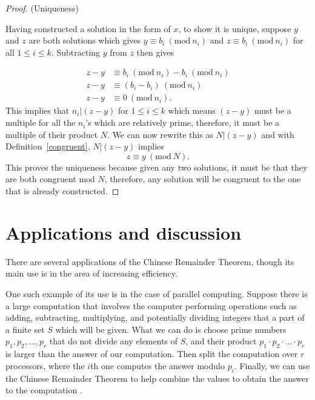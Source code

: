 \documentclass[12pt,a4paper,reqno,parskip=full]{amsart}
\numberwithin{equation}{section}
\theoremstyle{plain}
\theoremstyle{definition}
\newcommand{\Mod}[1]{\ (\mathrm{mod}\ #1)}
\begin{document}
\begin{proof}
	(Uniqueness)

	Having constructed a solution in the form of $x$, to show it is unique, suppose $y$ and $z$ are both solutions which gives $y\equiv b_i \Mod{n_i}$ and $z \equiv b_i \Mod{n_i}$ for all $ 1 \le i \le k$. Subtracting $y$ from $z$ then gives

	\begin{align*}
		z-y &\equiv b_i \Mod{n_i} - b_i \Mod{n_i}\\
		z-y &\equiv (b_i-b_i) \Mod{n_i}\\
		z-y &\equiv 0 \Mod{n_i}.
	\end{align*}
	This implies that $n_i | (z-y)$ for $1 \le i \le k$ which means $(z-y)$ must be a multiple for all the $n_i$'s which are relatively prime, therefore, it must be a multiple of their product $N$. We can now rewrite this as $N | (z-y)$ and with Definition~\ref{congruent}, $N|(z-y)$ implies $$z \equiv y \Mod{N}.$$ This proves the uniqueness because given any two solutions, it must be that they are both congruent $\text{mod } N$, therefore, any solution will be congruent to the one that is already constructed.\cite{Penn}
\end{proof}



 


\section{Applications and discussion}

There are several applications of the Chinese Remainder Theorem, though its main use is in the area of increasing efficiency. 

One such example of its use is in the case of parallel computing. Suppose there is a large computation that involves the computer performing operations such as adding, subtracting, multiplying, and potentially dividing integers that a part of a finite set $S$ which will be given. What we can do is choose prime numbers $p_1, p_2, \ldots, p_r$ that do not divide any elements of $S$, and their product $p_1 \cdot p_2 \cdot \ldots \cdot p_r$ is larger than the answer of our computation. Then split the computation over $r$ processors, where the $i$th one computes the answer modulo $p_i$. Finally, we can use the Chinese Remainder Theorem to help combine the values to obtain the answer to the computation \cite{Uses}. 
\end{document}
